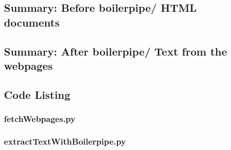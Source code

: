 \newpage

\subsection{Summary: Before boilerpipe/ HTML documents}

\begingroup
\obeylines

\endgroup

\subsection{Summary: After boilerpipe/ Text from the webpages}
\begingroup
\obeylines

\endgroup

\subsection{Code Listing}
\subsubsection{fetchWebpages.py}


\newpage

\subsubsection{extractTextWithBoilerpipe.py}

\newpage














